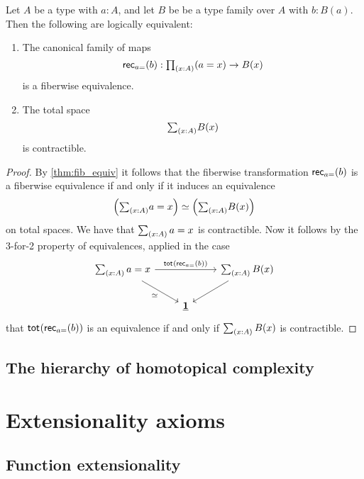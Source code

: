\begin{thm}\label{thm:id_fundamental}
Let $A$ be a type with $a:A$, and let $B$ be be a type family over $A$ with $b:B(a)$.
Then  the following are logically equivalent:
\begin{enumerate}
\item The canonical family of maps
\begin{equation*}
\rec{a{=}}(b):\prd{x:A} (a=x)\to B(x)
\end{equation*}
is a fiberwise equivalence.
\item The total space
\begin{equation*}
\sm{x:A}B(x)
\end{equation*}
is contractible.
\end{enumerate}
\end{thm}

\begin{proof}
By \autoref{thm:fib_equiv} it follows that the fiberwise transformation $\mathsf{rec}_{a{=}}(b)$ is a fiberwise equivalence if and only if it induces an equivalence
\begin{equation*}
\eqv{\Big(\sm{x:A}a=x\Big)}{\Big(\sm{x:A}B(x)\Big)}
\end{equation*}
on total spaces. We have that $\sm{x:A}a=x$ is contractible. Now it follows by the 3-for-2 property of equivalences, applied in the case
\begin{equation*}
\begin{tikzcd}
\sm{x:A}a=x \arrow[rr,"\total{\rec{a{=}}(b)}"] \arrow[dr,swap,"\eqvsym"] & & \sm{x:A}B(x) \arrow[dl] \\
& \unit
\end{tikzcd}
\end{equation*}
that $\mathsf{tot}_{}(\mathsf{rec}_{a{=}}(b))$ is an equivalence if and only if $\sm{x:A}B(x)$ is contractible.
\end{proof}

\subsection{The hierarchy of homotopical complexity}

\section{Extensionality axioms}

\subsection{Function extensionality}


